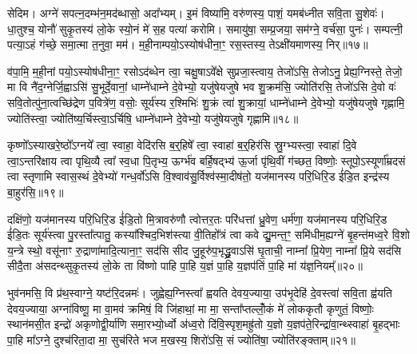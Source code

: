 सेदिम। अग्ने॑ सपत्न॒दम्भ॑न॒मद॑ब्धासो॒ अदा᳚भ्यम्। इ॒मं विष्या॑मि॒ वरु॑णस्य॒ पाशं॒ यमब॑ध्नीत सवि॒ता सु॒शेवः॑। धा॒तुश्च॒ योनौ॑ सुकृ॒तस्य॑ लो॒के स्यो॒नं मे॑ स॒ह पत्या॑ करोमि। समायु॑षा॒ सम्प्र॒जया॒ सम॑ग्ने॒ वर्च॑सा॒ पुनः॑। सम्पत्नी॒ पत्या॒\-ऽहं ग॑च्छे॒ समा॒त्मा त॒नुवा॒ मम॑। म॒ही॒नाम्पयो॒\-ऽस्योष॑धीना॒ꣳ॒ रस॒स्तस्य॒ ते\-ऽक्षी॑यमाणस्य॒ निर्॥१७॥

व॑पा॒मि॒ म॒ही॒नां पयो॒\-ऽस्योष॑धीना॒ꣳ॒ रसो\-ऽद॑ब्धेन त्वा॒ चक्षु॒षा\-ऽवे᳚क्षे सुप्रजा॒स्त्वाय॒ तेजो॑\-ऽसि॒ तेजो\-ऽनु॒ प्रेह्य॒ग्निस्ते॒ तेजो॒ मा वि नै॑द॒ग्नेर्जि॒ह्वा\-ऽसि॑ सु॒भूर्दे॒वानां॒ धाम्ने॑धाम्ने दे॒वेभ्यो॒ यजु॑षेयजुषे भव शु॒क्रम॑सि॒ ज्योति॑रसि॒ तेजो॑\-ऽसि दे॒वो वः॑ सवि॒तोत्पु॑ना॒त्वच्छि॑द्रेण प॒वित्रे॑ण॒ वसोः॒ सूर्य॑स्य र॒श्मिभिः॑ शु॒क्रं त्वा॑ शु॒क्रायां॒ धाम्ने॑धाम्ने दे॒वेभ्यो॒ यजु॑षेयजुषे गृह्णामि॒ ज्योति॑स्त्वा॒ ज्योति॑ष्य॒र्चिस्त्वा॒\-ऽर्चिषि॒ धाम्ने॑धाम्ने दे॒वेभ्यो॒ यजु॑षेयजुषे गृह्णामि॥१८॥

{\anuvakamend[{उप॒ नी र॒श्मिभिः॑ शु॒क्रꣳ षोड॑श च। (10)}]}

कृष्णो᳚\-ऽस्याखरे॒ष्ठो᳚\-ऽग्नये᳚ त्वा॒ स्वाहा॒ वेदि॑रसि ब॒र्॒हिषे᳚ त्वा॒ स्वाहा॑ ब॒र्॒हिर॑सि स्रु॒ग्भ्यस्त्वा॒ स्वाहा॑ दि॒वे त्वा॒\-ऽन्तरि॑क्षाय त्वा पृथि॒व्यै त्वा᳚ स्व॒धा पि॒तृभ्य॒ ऊर्ग्भ॑व बर्\mbox{}हि॒षद्भ्य॑ ऊ॒र्जा पृ॑थि॒वीं ग॑च्छत॒ विष्णोः॒ स्तूपो॒\-ऽस्यूर्णा᳚म्रदसं त्वा स्तृणामि स्वास॒स्थं दे॒वेभ्यो॑ गन्ध॒र्वो॑\-ऽसि वि॒श्वाव॑सु॒र्विश्व॑स्मा॒दीष॑तो॒ यज॑मानस्य परि॒धिरि॒ड ई॑डि॒त इन्द्र॑स्य बा॒हुर॑सि॒॥१९॥

दक्षि॑णो॒ यज॑मानस्य परि॒धिरि॒ड ई॑डि॒तो मि॒त्रावरु॑णौ त्वोत्तर॒तः परि॑धत्तां ध्रु॒वेण॒ धर्म॑णा॒ यज॑मानस्य परि॒धिरि॒ड ई॑डि॒तः सूर्य॑स्त्वा पु॒रस्ता᳚त्पातु॒ कस्या᳚श्चिद॒भिश॑स्त्या वी॒तिहो᳚त्रं त्वा कवे द्यु॒मन्त॒ꣳ॒ समि॑धीम॒ह्यग्ने॑ बृ॒हन्त॑मध्व॒रे वि॒शो य॒न्त्रे स्थो॒ वसू॑नाꣳ रु॒द्राणा॑मादि॒त्याना॒ꣳ॒ सद॑सि सीद जु॒हूरु॑प॒भृद्ध्रु॒वा\-ऽसि॑ घृ॒ताची॒ नाम्ना᳚ प्रि॒येण॒ नाम्ना᳚ प्रि॒ये सद॑सि सीदै॒ता अ॑सदन्थ्सुकृ॒तस्य॑ लो॒के ता वि॑ष्णो पाहि पा॒हि य॒ज्ञं पा॒हि य॒ज्ञप॑तिं पा॒हि मां य॑ज्ञ॒नियम्᳚॥२०॥

{\anuvakamend[{बा॒हुर॑सि प्रि॒ये सद॑सि पञ्च॑दश च। (11)}]}

भुव॑नमसि॒ वि प्र॑थ॒स्वाग्ने॒ यष्ट॑रि॒दन्नमः॑। जुह्वेह्य॒ग्निस्त्वा᳚ ह्वयति देवय॒ज्याया॒ उप॑भृ॒देहि॑ दे॒वस्त्वा॑ सवि॒ता ह्व॑यति देवय॒ज्याया॒ अग्ना॑विष्णू॒ मा वा॒मव॑ क्रमिषं॒ वि जि॑हाथां॒ मा मा॒ सन्ता᳚प्तल्लोँ॒कं मे॑ लोककृतौ कृणुतं॒ विष्णोः॒ स्थान॑मसी॒त इन्द्रो॑ अकृणोद्वी॒र्या॑णि समा॒रभ्यो॒र्ध्वो अ॑ध्व॒रो दि॑वि॒स्पृश॒मह्रु॑तो य॒ज्ञो य॒ज्ञप॑ते॒रिन्द्रा॑वा॒न्थ्स्वाहा॑ बृ॒हद्भाः पा॒हि मा᳚ऽग्ने॒ दुश्च॑रिता॒दा मा॒ सुच॑रिते भज म॒खस्य॒ शिरो॑\-ऽसि॒ सं ज्योति॑षा॒ ज्योति॑रङ्क्ताम्॥२१॥

